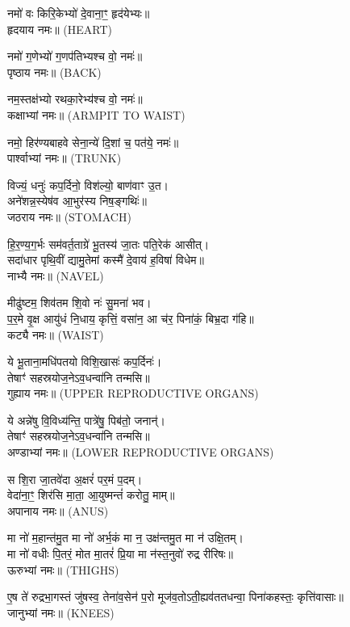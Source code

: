 नमो॑ वः किरि॒केभ्यो॑ दे॒वाना॒ꣳ॒ हृद॑येभ्यः॥\\
हृदयाय नमः॥ {\scriptsize (HEART)}

नमो॑ ग॒णेभ्यो॑ ग॒णप॑तिभ्यश्च वो॒ नमः॑॥\\
पृष्ठाय नमः॥ {\scriptsize (BACK)}

नम॒स्तक्ष॑भ्यो रथका॒रेभ्य॑श्च वो॒ नमः॑॥\\
कक्षाभ्यां नमः॥ {\scriptsize (ARMPIT TO WAIST)}

नमो॒ हिर॑ण्यबाहवे सेना॒न्ये॑ दि॒शां च॒ पत॑ये॒ नमः॑॥\\
पार्श्वाभ्यां नमः॥ {\scriptsize (TRUNK)}

विज्यं॒ धनुः॑ कप॒र्दिनो॒ विश॑ल्यो॒ बाण॑वाꣳ उ॒त।\\
अने॑शन्न॒स्येष॑व आ॒भुर॑स्य निष॒ङ्गथिः॑॥\\
जठराय नमः॥ {\scriptsize (STOMACH)}

हि॒र॒ण्य॒ग॒र्भः सम॑वर्त॒ताग्रे॑ भू॒तस्य॑ जा॒तः पति॒रेक॑ आसीत्।\\
सदा॑धार पृथि॒वीं द्यामु॒तेमां कस्मै॑ दे॒वाय॑ ह॒विषा॑ विधेम॥\\
नाभ्यै नमः॥ {\scriptsize (NAVEL)}

मीढु॑ष्टम॒ शिव॑तम शि॒वो नः॑ सु॒मना॑ भव।\\
प॒र॒मे वृ॒क्ष आयु॑धं नि॒धाय॒ कृत्तिं॒ वसा॑न॒ आ च॑र॒ पिना॑कं॒ बिभ्र॒दा ग॑हि॥\\
कट्यै नमः॥ {\scriptsize (WAIST)}

ये भू॒ताना॒मधि॑पतयो विशि॒खासः॑ कप॒र्दिनः॑।\\
तेषाꣳ॑ सहस्रयोज॒नेऽव॒धन्वा॑नि तन्मसि॥\\
गुह्याय नमः॥ {\scriptsize (UPPER REPRODUCTIVE ORGANS)}

ये अन्ने॑षु वि॒विध्य॑न्ति॒ पात्रे॑षु॒ पिब॑तो॒ जनान्॑।\\
तेषाꣳ॑ सहस्रयोज॒नेऽव॒धन्वा॑नि तन्मसि॥\\
अण्डाभ्यां नमः॥ {\scriptsize (LOWER REPRODUCTIVE ORGANS)}

स शि॒रा जा॒तवे॑दा अ॒क्षरं॑ पर॒मं प॒दम्।\\
वेदा॑ना॒ꣳ॒ शिर॑सि मा॒ता॒ आ॒युष्मन्तं॑ करोतु॒ माम्॥\\
अपानाय नमः॥ {\scriptsize (ANUS)}

मा नो॑ म॒हान्त॑मु॒त मा नो॑ अर्भ॒कं मा न॒ उक्ष॑न्तमु॒त मा न॑ उक्षि॒तम्।\\
मा नो॑ वधीः पि॒तरं॒ मोत मा॒तरं॑ प्रि॒या मा न॑स्त॒नुवो॑ रुद्र रीरिषः॥\\
ऊरुभ्यां नमः॥ {\scriptsize (THIGHS)}

ए॒ष ते॑ रुद्रभा॒गस्तं जु॑षस्व॒ तेना॑व॒सेन॑ प॒रो मूज॑व॒तोऽती॒\-ह्यव॑ततधन्वा॒ पिना॑कहस्तः॒ कृत्ति॑वासाः॥\\
जानुभ्यां नमः॥ {\scriptsize (KNEES)}

